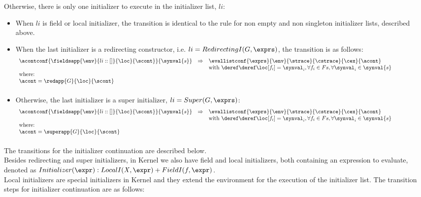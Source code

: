 \documentclass{article}
\begin{document}
\noindent
Otherwise, there is only one initializer to execute in the initializer list, $li$: \\
\begin{itemize}

\item When $li$ is field or local initializer, the transition is identical to the rule for non empty and non singleton initializer lists, described above.\\
\item When the last initializer is a redirecting constructor, i.e. $li = RedirectingI(G, \exprs)$, the transition is as follows:
\[
  \begin{array}{lcl@{\hspace{30mm}}}
	\acontconf{\fieldsapp{\env}{li::[]}{\loc}{\scont}}{\synval{s}}
	& \Rightarrow &
	\evallistconf{\exprs}{\env}{\strace}{\cstrace}{\cex}{\acont}\\	
	&&\textrm{with }\deref\deref\loc[f_i] = \synval_{i}, \forall f_i \in Fs, \forall \synval_i \in \synval{s}\\
	\textrm{where:}\\
	\acont = \redapp{G}{\loc}{\scont}\\[2mm]
  \end{array}
\]

\item Otherwise, the last initializer is a super initializer, $li = Super(G, \exprs)$:
\[
  \begin{array}{lcl@{\hspace{30mm}}}
	\acontconf{\fieldsapp{\env}{li::[]}{\loc}{\scont}}{\synval{s}}
	& \Rightarrow &
	\evallistconf{\exprs}{\env}{\strace}{\cstrace}{\cex}{\acont}\\	
	&&\textrm{with }\deref\deref\loc[f_i] = \synval_{i}, \forall f_i \in Fs, \forall \synval_i \in \synval{s}\\
	\textrm{where:}\\
	\acont = \superapp{G}{\loc}{\scont}\\[2mm]
  \end{array}
\]
\end{itemize}
The transitions for the initializer continuation are described below.\\[2mm]
\noindent
Besides redirecting and super initializers, in Kernel we also have field and local initializers, both containing an expression to evaluate, denoted as $Initializer(\expr) : LocalI(\variablemeta, \expr) + FieldI(f, \expr)$.\\[2mm]
Local initializers are special initializers in Kernel and they extend the environment for the execution of the initializer list. The transition steps for initializer continuation are as follows:
\end{document}

